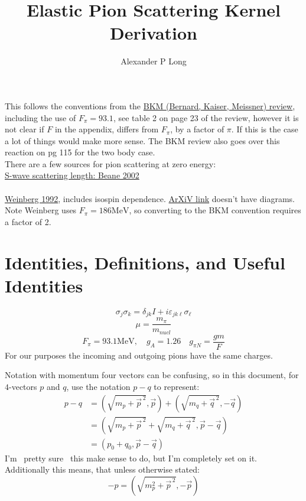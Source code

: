 \documentclass[11pt]{article}
\author{Alexander P Long}
\title{Elastic Pion Scattering Kernel Derivation}
\newcommand{\sq}{^{\,2}}
\begin{document}
\maketitle
This follows the conventions from the \href{https://arxiv.org/abs/hep-ph/9501384v1}{BKM (Bernard, Kaiser, Meissner)  review}, including the use of $F_\pi=93.1$, see table 2 on page 23 of the review, however it is not clear if $F$ in the appendix, differs from $F_\pi$, by a factor of $\pi$. If this is the case a lot of things would make more sense.
The BKM review also goes over this reaction on pg 115 for the two body case.\\

There are a few sources for pion scattering at zero energy:\\
\href{https://arxiv.org/abs/hep-ph/0206219v1}{S-wave scattering length: Beane 2002}\\~\\
\href{https://www.sciencedirect.com/science/article/abs/pii/037026939290099P}{Weinberg 1992}, includes isospin dependence. \href{https://arxiv.org/pdf/hep-ph/9209257.pdf}{ArXiV link} doesn't have diagrams.
Note Weinberg uses $F_\pi=186 \mathrm{MeV}$, so converting to the BKM convention requires a factor of 2.
\tableofcontents
\section{Identities, Definitions, and Useful Identities}
\begin{equation}
    \sigma_j \sigma_k = \delta_{jk} I + i \varepsilon_{jk\ell} \sigma_{\ell}
\end{equation}
\begin{equation}
    \mu= \frac{m_\pi}{m_{nucl}}
\end{equation}
\begin{equation}
    F_\pi=93.1 \mathrm{MeV}, \quad g_A = 1.26\quad g_{\pi N}= \frac{gm}{F}
\end{equation}
For our purposes the incoming and outgoing pions have the same charges.

Notation with momentum four vectors can be confusing, so in this document, for $4$-vectors $p$ and $q$, use the notation
$p-q$ to represent:
\begin{align}
    p-q&= (\sqrt{m_p+\vec{p}\sq}, \vec{p}) + (\sqrt{m_q+\vec{q}\sq},-\vec{q})\\
       &= \left(\sqrt{m_p+\vec{p}\sq}+\sqrt{m_q+\vec{q}\sq},\vec{p}-\vec{q} \right)\\
       &= \left(p_0+q_0,\vec{p}-\vec{q} \right)
\end{align}
I'm ~pretty sure~ this make sense to do, but I'm completely set on it. Additionally this means, that unless otherwise
stated:
\begin{equation}
    -p= \left( \sqrt{m_p^2 + \vec{p}\sq },-\vec{p} \right)
\end{equation}
\end{document}
